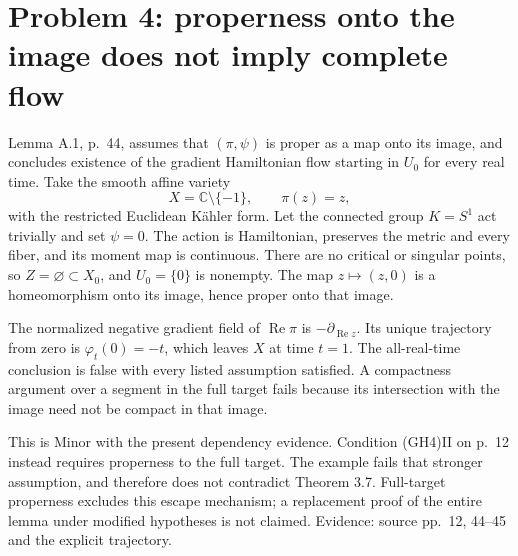 \documentclass[10pt]{article}
\begin{document}
\section*{Problem 4: properness onto the image does not imply complete flow}
Lemma A.1, p. 44, assumes that \((\pi,\psi)\) is proper as a map onto its image, and concludes existence of the gradient Hamiltonian flow starting in \(U_0\) for every real time. Take the smooth affine variety \[X=\mathbb C\setminus\{-1\},\qquad \pi(z)=z ,\] with the restricted Euclidean Kähler form. Let the connected group \(K=S^1\) act trivially and set \(\psi=0\). The action is Hamiltonian, preserves the metric and every fiber, and its moment map is continuous. There are no critical or singular points, so \(Z=\varnothing\subset X_0\), and \(U_0=\{0\}\) is nonempty. The map \(z\mapsto(z,0)\) is a homeomorphism onto its image, hence proper onto that image.\par
The normalized negative gradient field of \(\operatorname{Re}\pi\) is \(-\partial_{\operatorname{Re}z}\). Its unique trajectory from zero is \(\varphi_t(0)=-t\), which leaves \(X\) at time \(t=1\). The all-real-time conclusion is false with every listed assumption satisfied. A compactness argument over a segment in the full target fails because its intersection with the image need not be compact in that image.\par
This is Minor with the present dependency evidence. Condition (GH4)II on p. 12 instead requires properness to the full target. The example fails that stronger assumption, and therefore does not contradict Theorem 3.7. Full-target properness excludes this escape mechanism; a replacement proof of the entire lemma under modified hypotheses is not claimed. Evidence: source pp. 12, 44–45 and the explicit trajectory.\par
\end{document}
